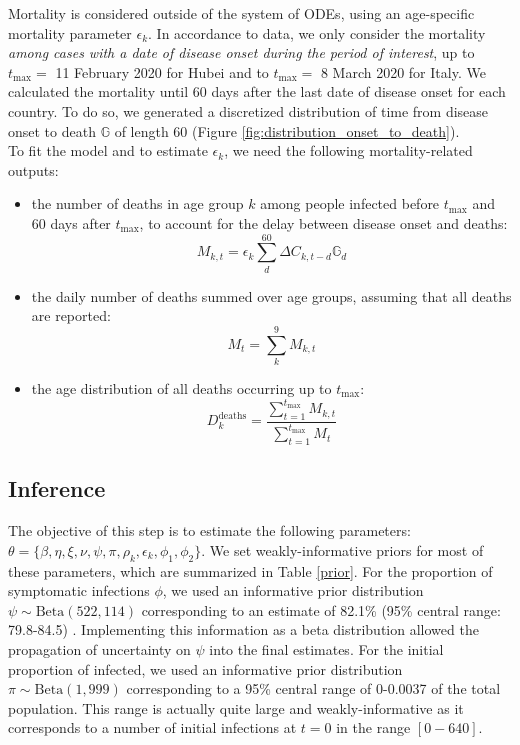 \documentclass{article}
\begin{document}
Mortality is considered outside of the system of ODEs, using an age-specific mortality parameter $\epsilon_k$.
In accordance to data, we only consider the mortality {\em among cases with a date of disease onset during the period of interest}, up to $t_{\text{max}}=$ 11 February 2020 for Hubei and to $t_{\text{max}}=$ 8 March 2020 for Italy. 
We calculated the mortality until 60 days after the last date of disease onset for each country. 
To do so, we generated a discretized distribution of time from disease onset to death $\mathds{G}$ of length 60 (Figure \ref{fig:distribution_onset_to_death}).\\
To fit the model and to estimate $\epsilon_k$, we need the following mortality-related outputs:	
	\begin{itemize}
		\item the  number of deaths in age group $k$ among people infected before $t_{\text{max}}$ and 60 days after $t_{\text{max}}$, to account for the delay between disease onset and deaths:
		\begin{equation}
		M_{k,t}= \epsilon_k\sum_d^{60}  \Delta C_{k,t-d} \mathds{G}_d 
		\end{equation}
		\item the daily number of deaths summed over age groups, assuming that all deaths are reported:
		\begin{equation}
		M_{t}= \sum_k^9 M_{k,t}
		\end{equation}
		\item the age distribution of all deaths occurring up to $t_{\text{max}}$:
		\begin{equation}
		D_k^{\text{deaths}} = \frac{\sum_{t=1}^{t_{\text{max}}} M_{k,t}}{ \sum_{t=1}^{t_{\text{max}}} M_{t}}
		\end{equation}
	\end{itemize}
	
	
	\subsection{Inference}
	
	The objective of this step is to estimate the following parameters: $\theta=\{\beta, \eta, \xi, \nu, \psi, \pi, \rho_k, \epsilon_k, \phi_1, \phi_2 \}$. We set weakly-informative priors for most of these parameters, which are summarized in Table \ref{prior}.
	For the proportion of symptomatic infections $\phi$, we used an informative prior distribution $\psi \sim \text{Beta}(522,114)$ corresponding to an estimate of 82.1\% (95\% central range: 79.8-84.5) \cite{mizumoto2020estimating}. Implementing this information as a beta distribution allowed the propagation of uncertainty on $\psi$ into the final estimates. For the initial proportion of infected, we used an informative prior distribution $\pi \sim \text{Beta}(1,999)$ corresponding to a 95\% central range of 0-0.0037 of the total population. This range is actually quite large and weakly-informative as it corresponds to a number of initial infections at $t=0$ in the range $[0-640]$.
	
\end{document}
